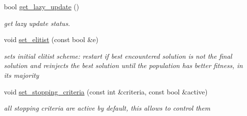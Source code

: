 \begin{DoxyCompactItemize}
bool \hyperlink{classlibcmaes_1_1CMAParameters_ab3e15fdeb9362807a5c27be66d284065}{get\-\_\-lazy\-\_\-update} ()
\begin{DoxyCompactList}\small\item\em get lazy update status. \end{DoxyCompactList}\item 
void \hyperlink{classlibcmaes_1_1CMAParameters_acd0837374b53bc4ee430fa796e8f677c}{set\-\_\-elitist} (const bool \&e)
\begin{DoxyCompactList}\small\item\em sets initial elitist scheme\-: restart if best encountered solution is not the final solution and reinjects the best solution until the population has better fitness, in its majority \end{DoxyCompactList}\item 
void \hyperlink{classlibcmaes_1_1CMAParameters_a3418542ed2b440079cb3d9def7dcb25e}{set\-\_\-stopping\-\_\-criteria} (const int \&criteria, const bool \&active)
\begin{DoxyCompactList}\small\item\em all stopping criteria are active by default, this allows to control them \end{DoxyCompactList}\end{DoxyCompactItemize}
